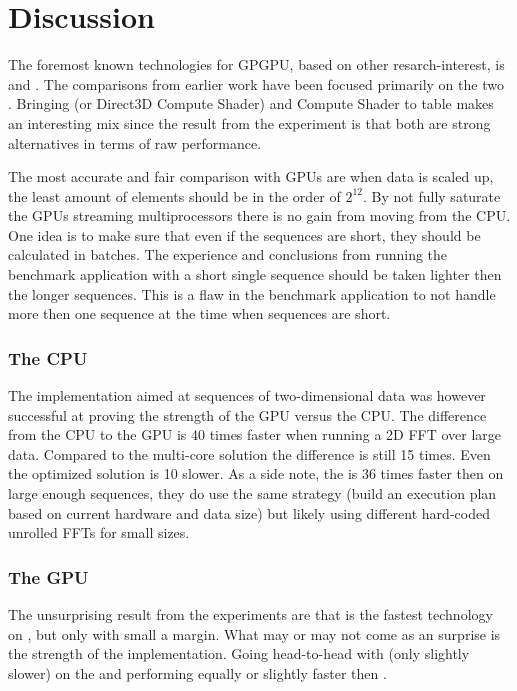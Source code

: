 \newpage

\section{Discussion}

The foremost known technologies for GPGPU, based on other resarch-interest, is {\CU} and {\OCL}. The comparisons from earlier work have been focused primarily on the two \cite{fang2011comprehensive, park2011design, su2012overview}. Bringing {\DX} (or Direct3D Compute Shader) and {\GL} Compute Shader to table makes an interesting mix since the result from the experiment is that both are strong alternatives in terms of raw performance.

The most accurate and fair comparison with GPUs are when data is scaled up, the least amount of elements should be in the order of $2^{12}$. By not fully saturate the GPUs streaming multiprocessors there is no gain from moving from the CPU. One idea is to make sure that even if the sequences are short, they should be calculated in batches. The experience and conclusions from running the benchmark application with a short single sequence should be taken lighter then the longer sequences. This is a flaw in the benchmark application to not handle more then one sequence at the time when sequences are short.

\subsubsection{The CPU}

The implementation aimed at sequences of two-dimensional data was however successful at proving the strength of the GPU versus the CPU. The difference from the CPU to the GPU is 40 times faster when running a 2D FFT over large data. Compared to the multi-core {\OMP} solution the difference is still 15 times. Even the optimized {\FFTW} solution is 10 slower. As a side note, the {\CUFFT} is 36 times faster then {\FFTW} on large enough sequences, they do use the same strategy (build an execution plan based on current hardware and data size) but likely using different hard-coded unrolled FFTs for small sizes.

\subsubsection{The GPU}

The unsurprising result from the experiments are that {\CU} is the fastest technology on {\NVCARD}, but only with small a margin. What may or may not come as an surprise is the strength of the {\DX} implementation. Going head-to-head with {\CU} (only slightly slower) on the {\NVCARD} and performing equally or slightly faster then {\OCL}.

